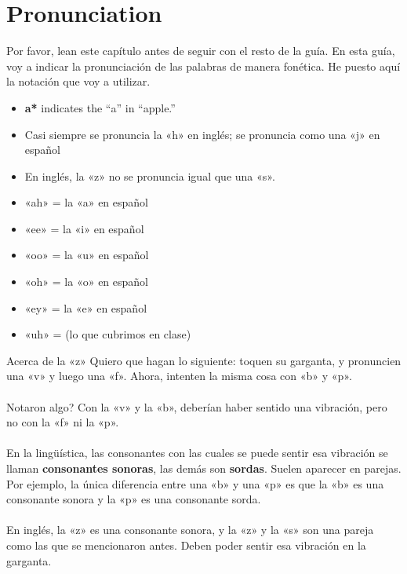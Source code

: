 \chapter{Pronunciation}

Por favor, lean este cap\'itulo antes de seguir con el resto de la gu\'ia.
En esta guía, voy a indicar la pronunciaci\'on de las palabras de manera fon\'etica.
He puesto aquí la notaci\'on que voy a utilizar.


\begin{itemize}
	\item \textbf{a*} indicates the ``a'' in ``apple.''
	\item Casi siempre se pronuncia la «h» en inglés;
			se pronuncia como una «j» en espa\~nol
	\item En inglés, la «z» no se pronuncia igual que una «s».
	\item «ah» = la «a» en espa\~nol
	\item «ee» = la «i» en espa\~nol
	\item «oo» = la «u» en espa\~nol
	\item «oh» = la «o» en espa\~nol
	\item «ey» = la «e» en espa\~nol
	\item «uh» =  (lo que cubrimos en clase)
\end{itemize}

\begin{conf}{Acerca de la «z»}
Quiero que hagan lo siguiente: toquen su garganta, y pronuncien una «v» y luego una «f».
	Ahora, intenten la misma cosa con «b» y «p».\\
\\
\textquestiondown Notaron algo? Con la «v» y la «b», deber\'ian haber
	sentido una vibraci\'on, pero no con la «f» ni la «p». \\
\\
En la ling\"u\'istica, las consonantes con las cuales se puede sentir esa vibraci\'on
	se llaman \textbf{consonantes sonoras}, las dem\'as son \textbf{sordas}. Suelen
	aparecer en parejas. Por ejemplo, la \'unica diferencia entre una «b» y una «p» es
	que la «b» es una consonante sonora y la «p» es una consonante sorda.\\
\\
En ingl\'es, la «z» es una consonante sonora, y la «z» y la «s» son una pareja como las que se mencionaron antes. Deben poder sentir esa vibraci\'on en la garganta.
\end{conf}
